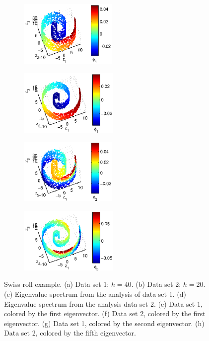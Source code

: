 \documentclass[preprint]{elsarticle}
\begin{document}
\begin{figure}[!th]
\begin{subfigure}{0.45\textwidth}
\includegraphics[height=1.25in]{swissroll1_color1} 
\caption{}
\end{subfigure}
\hfill
\begin{subfigure}{0.45\textwidth}
\centering
\includegraphics[height=1.25in]{swissroll2_color1}
\caption{}
\end{subfigure}
\hfill
\begin{subfigure}{0.45\textwidth}
\centering
\includegraphics[height=1.25in]{swissroll1_color2}
\caption{}
\end{subfigure}
\hfill
\begin{subfigure}{0.45\textwidth}
\centering
\includegraphics[height=1.25in]{swissroll2_color2}
\caption{}
\end{subfigure}
%
\caption{Swiss roll example. (a) Data set 1; $h= 40$. (b) Data set 2; $h = 20$. (c) Eigenvalue spectrum from the analysis of data set 1. (d) Eigenvalue spectrum from the analysis data set 2. (e) Data set 1, colored by the first eigenvector. (f) Data set 2, colored by the first eigenvector. (g) Data set 1, colored by the second eigenvector. (h) Data set 2, colored by the fifth eigenvector. } 
\label{fig:swiss_rolls}	
\end{figure}
\end{document}
